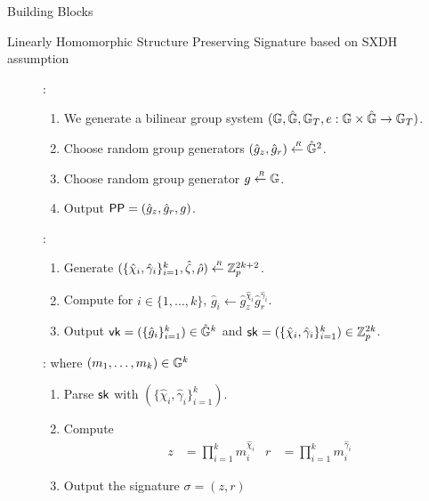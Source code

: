 \begin{subsection}{Building Blocks}

  \begin{myDef}{Linearly Homomorphic Structure Preserving Signature based on SXDH assumption~\cite{DBLP:conf/crypto/LibertPJY13}}
    \begin{description}
    \item[]:
      \begin{enumerate}
      \item We generate a bilinear group system $(\mathbb{G}, \hat{\mathbb{G}}, \mathbb{G}_T, e:\mathbb{G} \times \hat{\mathbb{G}} \to \mathbb{G}_T)$.
      \item Choose random group generators $(\hat{g}_z, \hat{g}_r) \stackrel{{\scriptscriptstyle \mkern4mu R}}{\gets} \hat{\mathbb{G}}^2$.
      \item Choose random group generator $g \stackrel{{\scriptscriptstyle \mkern4mu R}}{\gets} \mathbb{G}$.
      \item Output $\mathsf{PP} = (\hat{g}_z, \hat{g}_r, g)$.
      \end{enumerate}
    \item[]:
      \begin{enumerate}
      \item Generate $(\{\hat{\chi}_i, \hat{\gamma}_i\}_{i =1 }^k, \hat{\zeta}, \hat{\rho}) \stackrel{{\scriptscriptstyle \mkern4mu R}}{\gets} \mathbb{Z}_p^{2k+2}$.
      \item Compute for $i \in \{1, \dots, k\}$, $\hat{g}_i \gets \hat{g}_z^{\hat{\chi}_i}\hat{g}_r^{\hat{\gamma}_i}$.
      \item Output $\mathsf{vk} = (\{\hat{g}_i\}_{i=1}^k) \in \hat{\mathbb{G}}^{k}$ and $\mathsf{sk} = (\{\hat{\chi}_i, \hat{\gamma}_i\}_{i=1}^k) \in \mathbb{Z}_p^{2k}$.
      \end{enumerate}
    \item[]: where $(m_1, \dots, m_k) \in \mathbb{G}^k$
      \begin{enumerate}
      \item Parse $\mathsf{sk}$ with $(\{\hat{\chi}_i, \hat{\gamma}_i\}_{i = 1}^k)$.
      \item Compute
        \begin{align*}
          z &= \prod_{i=1}^km_i^{\hat{\chi}_i} & r &= \prod_{i =1}^km_i^{\hat{\gamma}_i} 
        \end{align*}
      \item Output the signature $\sigma = (z, r)$
      \end{enumerate}


\end{description}
\end{myDef}
\end{subsection}
